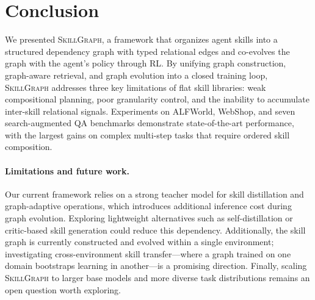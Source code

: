 \section{Conclusion}
\label{sec:conclusion}

We presented \textsc{SkillGraph}, a framework that organizes agent skills into a structured dependency graph with typed relational edges and co-evolves the graph with the agent's policy through RL. By unifying graph construction, graph-aware retrieval, and graph evolution into a closed training loop, \textsc{SkillGraph} addresses three key limitations of flat skill libraries: weak compositional planning, poor granularity control, and the inability to accumulate inter-skill relational signals. Experiments on ALFWorld, WebShop, and seven search-augmented QA benchmarks demonstrate state-of-the-art performance, with the largest gains on complex multi-step tasks that require ordered skill composition.

\paragraph{Limitations and future work.}
Our current framework relies on a strong teacher model for skill distillation and graph-adaptive operations, which introduces additional inference cost during graph evolution. Exploring lightweight alternatives such as self-distillation or critic-based skill generation could reduce this dependency. Additionally, the skill graph is currently constructed and evolved within a single environment; investigating cross-environment skill transfer---where a graph trained on one domain bootstraps learning in another---is a promising direction. Finally, scaling \textsc{SkillGraph} to larger base models and more diverse task distributions remains an open question worth exploring.
